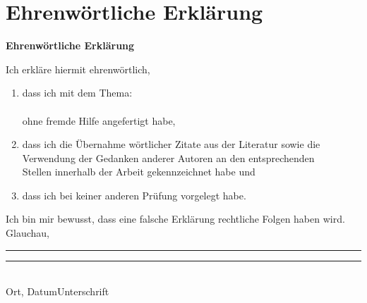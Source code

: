 \cleardoublepage
\chapter{Ehrenwörtliche Erklärung}
    \vspace*{1cm}
    \begin{center}
        \huge\textbf{Ehrenwörtliche Erklärung}\\
    \end{center}
    \vspace*{1cm}
    \normalsize
    Ich erkläre hiermit ehrenwörtlich,

    \begin{enumerate}
        \vspace{1cm}
        \item dass ich  mit dem Thema:\\

        \textbf{\titel }\\

        ohne fremde Hilfe angefertigt habe,
        \item dass ich die Übernahme wörtlicher Zitate aus der Literatur sowie die\\
        Verwendung der Gedanken anderer Autoren an den entsprechenden\\
        Stellen innerhalb der Arbeit gekennzeichnet habe und
        \item dass ich  bei keiner anderen Prüfung vorgelegt habe.\\[1,5cm]
    \end{enumerate}
    Ich bin mir bewusst, dass eine falsche Erklärung rechtliche Folgen haben wird.\\[1,5cm]

    Glauchau, \abgabedatum \newline\noindent\rule{0.35\columnwidth}{0.4pt}\hspace{0.05\columnwidth}\rule{0.6\columnwidth}{0.4pt}\\
    Ort, Datum\hspace{0.27\columnwidth}Unterschrift

    \newpage
